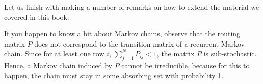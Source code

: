 


Let us finish with making a number of remarks on how to extend the material we covered in this book.

\begin{remark}
  If you happen to know a bit about Markov chains, observe that the routing matrix $P$ does not correspond to the transition matrix of a recurrent Markov chain.
  Since for at least one row $i$, $\sum_{j=1}^N P_{i j}<1$, the matrix $P$ is sub-stochastic.
  Hence, a Markov chain induced by $P$ cannot be irreducible, because for this to happen, the chain must stay in some absorbing set with probability 1.
\end{remark}




